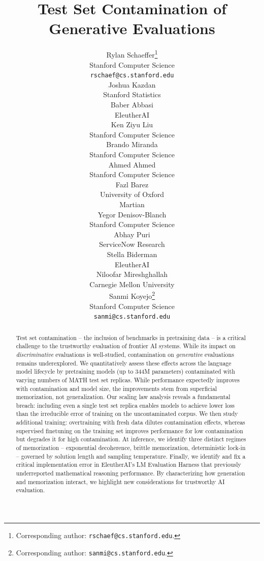 \documentclass{article}
\title{Test Set Contamination of Generative Evaluations}
\author{%
  Rylan Schaeffer\thanks{Corresponding author: \texttt{rschaef@cs.stanford.edu}.} \\
  Stanford Computer Science \\
  \texttt{rschaef@cs.stanford.edu} \\
  \And
  Joshua Kazdan \\
  Stanford Statistics \\
  \And
  Baber Abbasi \\
  EleutherAI \\
  \And
  Ken Ziyu Liu \\
  Stanford Computer Science \\
  \And
  Brando Miranda \\
  Stanford Computer Science \\
  \And
  Ahmed Ahmed \\
  Stanford Computer Science \\
  \AND
  Fazl Barez \\
  University of Oxford \\
  Martian \\
  \And
  Yegor Denisov-Blanch \\
  Stanford Computer Science \\
  \And
  Abhay Puri \\
  ServiceNow Research \\
  \And
  Stella Biderman \\
  EleutherAI \\
  \And
  Niloofar Mireshghallah \\
  Carnegie Mellon University \\
  \And
  Sanmi Koyejo\thanks{Corresponding author: \texttt{sanmi@cs.stanford.edu}.} \\
  Stanford Computer Science \\
  \texttt{sanmi@cs.stanford.edu} \\
}
\theoremstyle{plain}
\theoremstyle{definition}
\theoremstyle{remark}
\begin{document}
\maketitle


\begin{abstract}
    Test set contamination -- the inclusion of benchmarks in pretraining data -- is a critical challenge to the trustworthy evaluation of frontier AI systems.
    While its impact on \emph{discriminative} evaluations is well-studied, contamination on \emph{generative} evaluations remains underexplored.
    We quantitatively assess these effects across the language model lifecycle by pretraining models (up to 344M parameters) contaminated with varying numbers of MATH test set replicas.
    While performance expectedly improves with contamination and model size, the improvements stem from superficial memorization, not generalization.
    Our scaling law analysis reveals a fundamental breach: including even a single test set replica enables models to achieve lower loss than the irreducible error of training on the uncontaminated corpus.
    We then study additional training: overtraining with fresh data dilutes contamination effects, whereas supervised finetuning on the training set improves performance for low contamination but degrades it for high contamination.
    At inference, we identify three distinct regimes of memorization -- exponential decoherence, brittle memorization, deterministic lock-in -- governed by solution length and sampling temperature.
    Finally, we identify and fix a critical implementation error in EleutherAI's LM Evaluation Harness that previously underreported mathematical reasoning performance. By characterizing how generation and memorization interact, we highlight new considerations for trustworthy AI evaluation.
\end{abstract}










% 

\clearpage





\appendix




% 


\clearpage

\end{document}

